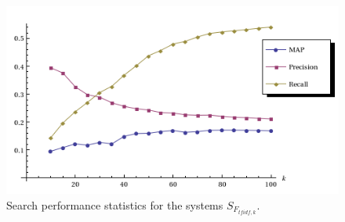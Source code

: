 \begin{figure}
\centering
\includegraphics[scale=.65]{tfidfstats}
\caption{Search performance statistics for the systems $S_{F_{tfidf,k}}$.}
\label{filter:fig:tfidfstats}
\end{figure}


